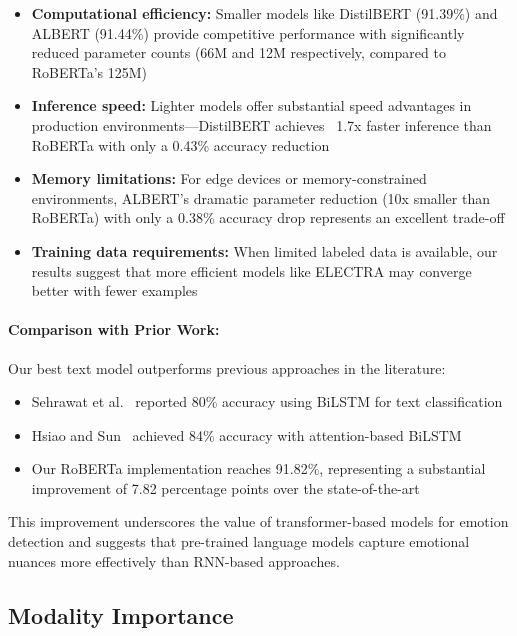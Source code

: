 \documentclass[12pt]{article}
\begin{document}
\begin{itemize}
    \item \textbf{Computational efficiency:} Smaller models like DistilBERT (91.39\%) and ALBERT (91.44\%) provide competitive performance with significantly reduced parameter counts (66M and 12M respectively, compared to RoBERTa's 125M)
    
    \item \textbf{Inference speed:} Lighter models offer substantial speed advantages in production environments—DistilBERT achieves ~1.7x faster inference than RoBERTa with only a 0.43\% accuracy reduction
    
    \item \textbf{Memory limitations:} For edge devices or memory-constrained environments, ALBERT's dramatic parameter reduction (10x smaller than RoBERTa) with only a 0.38\% accuracy drop represents an excellent trade-off
    
    \item \textbf{Training data requirements:} When limited labeled data is available, our results suggest that more efficient models like ELECTRA may converge better with fewer examples
\end{itemize}

\paragraph{Comparison with Prior Work:}
Our best text model outperforms previous approaches in the literature:
\begin{itemize}
    \item Sehrawat et al.~\cite{sehrawat2023deception} reported 80\% accuracy using BiLSTM for text classification
    \item Hsiao and Sun~\cite{hsiao2022attention} achieved 84\% accuracy with attention-based BiLSTM
    \item Our RoBERTa implementation reaches 91.82\%, representing a substantial improvement of 7.82 percentage points over the state-of-the-art
\end{itemize}

This improvement underscores the value of transformer-based models for emotion detection and suggests that pre-trained language models capture emotional nuances more effectively than RNN-based approaches.

\subsection{Modality Importance}
\end{document}
